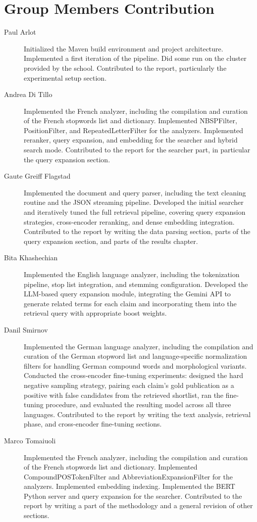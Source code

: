 \section{Group Members Contribution}


\begin{description}
	\item[Paul Arlot] Initialized the Maven build environment and project architecture. Implemented a first iteration of the pipeline. Did some run on the cluster provided by the school. Contributed to the report, particularly the experimental setup section.
	\item[Andrea Di Tillo] Implemented the French analyzer, including the compilation and curation of the French stopwords list and dictionary. Implemented NBSPFilter, PositionFilter, and RepeatedLetterFilter for the analyzers. Implemented reranker, query expansion, and embedding for the searcher and hybrid search mode. Contributed to the report for the searcher part, in particular the query expansion section.
	\item[Gaute Greiff Flagstad] Implemented the document and query parser, including the text cleaning routine and the JSON streaming pipeline. Developed the initial searcher and iteratively tuned the full retrieval pipeline, covering query expansion strategies, cross-encoder reranking, and dense embedding integration. Contributed to the report by writing the data parsing section, parts of the query expansion section, and parts of the results chapter.
	\item[Bita Khashechian] Implemented the English language analyzer, including the tokenization pipeline, stop list integration, and stemming configuration. Developed the LLM-based query expansion module, integrating the Gemini API to generate related terms for each claim and incorporating them into the retrieval query with appropriate boost weights.
	\item[Danil Smirnov] Implemented the German language analyzer, including the compilation and curation of the German stopword list and language-specific normalization filters for handling German compound words and morphological variants. Conducted the cross-encoder fine-tuning experiments: designed the hard negative sampling strategy, pairing each claim's gold publication as a positive with false candidates from the retrieved shortlist, ran the fine-tuning procedure, and evaluated the resulting model across all three languages. Contributed to the report by writing the text analysis, retrieval phase, and cross-encoder fine-tuning sections.
	\item[Marco Tomaiuoli] Implemented the French analyzer, including the compilation and curation of the French stopwords list and dictionary. Implemented CompoundPOSTokenFilter and AbbreviationExpansionFilter for the analyzers. Implemented embedding indexing. Implemented the BERT Python server and query expansion for the searcher. Contributed to the report by writing a part of the methodology and a general revision of other sections.

\end{description}